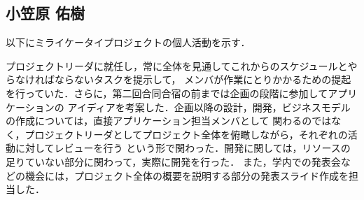 \subsection{小笠原 佑樹}

以下にミライケータイプロジェクトの個人活動を示す．

プロジェクトリーダに就任し，常に全体を見通してこれからのスケジュールとやらなければならないタスクを提示して，
メンバが作業にとりかかるための提起を行っていた．さらに，第二回合同合宿の前までは企画の段階に参加してアプリケーションの
アイディアを考案した．企画以降の設計，開発，ビジネスモデルの作成については，直接アプリケーション担当メンバとして
関わるのではなく，プロジェクトリーダとしてプロジェクト全体を俯瞰しながら，それぞれの活動に対してレビューを行う
という形で関わった．開発に関しては，リソースの足りていない部分に関わって，実際に開発を行った．
また，学内での発表会などの機会には，プロジェクト全体の概要を説明する部分の発表スライド作成を担当した．


